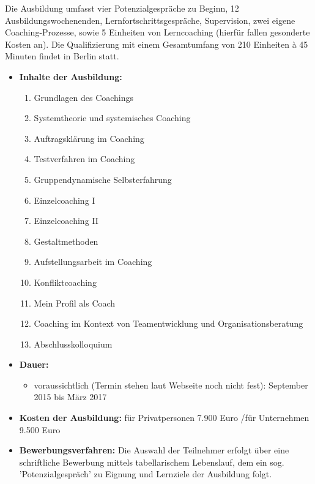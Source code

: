 \documentclass[11pt,a4paper]{article}
\begin{document}
Die Ausbildung umfasst vier Potenzialgespräche zu Beginn, 12 Ausbildungswochenenden, Lernfortschrittsgespräche, Supervision, zwei eigene Coaching-Prozesse, sowie 5 Einheiten von Lerncoaching (hierfür fallen gesonderte Kosten an). Die Qualifizierung mit einem Gesamtumfang von 210 Einheiten \`{a} 45 Minuten findet in Berlin statt.
	\begin{itemize}
	\item \textbf{Inhalte der Ausbildung:}
		
		\begin{enumerate}
		\item Grundlagen des Coachings
		\item Systemtheorie und systemisches Coaching
		\item Auftragsklärung im Coaching
		\item Testverfahren im Coaching
		\item Gruppendynamische Selbsterfahrung
		\item Einzelcoaching I
		\item Einzelcoaching II
		\item Gestaltmethoden
		\item Aufstellungsarbeit im Coaching
		\item Konfliktcoaching
		\item Mein Profil als Coach
		\item Coaching im Kontext von Teamentwicklung und Organisationsberatung
		\item Abschlusskolloquium
		\end{enumerate}
	
	\item \textbf{Dauer:}

		\begin{itemize} 
		\item voraussichtlich (Termin stehen laut Webseite noch nicht fest): September 2015 bis März 2017
		\end{itemize}

	\item \textbf{Kosten der Ausbildung:} für Privatpersonen 7.900 Euro /für Unternehmen 9.500 Euro

	\item \textbf{Bewerbungsverfahren:} Die Auswahl der Teilnehmer erfolgt über eine schriftliche Bewerbung mittels tabellarischem Lebenslauf, dem ein sog. 'Potenzialgespräch' zu Eignung und Lernziele der Ausbildung folgt.
	\end{itemize}


\end{document}
